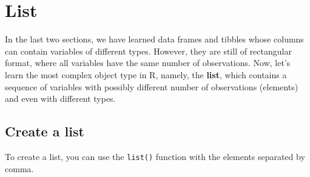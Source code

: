 \documentclass[
]{book}
\begin{document}
\hypertarget{list}{%
\section{List}\label{list}}

In the last two sections, we have learned data frames and tibbles whose columns can contain variables of different types. However, they are still of rectangular format, where all variables have the same number of observations. Now, let's learn the most complex object type in R, namely, the \textbf{list}, which contains a sequence of variables with possibly different number of observations (elements) and even with different types.

\hypertarget{create-a-list}{%
\subsection{Create a list}\label{create-a-list}}

To create a list, you can use the \texttt{list()} function with the elements separated by comma.
\end{document}
